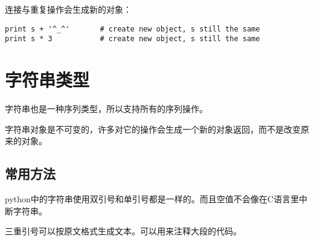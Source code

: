 连接与重复操作会生成新的对象：
\begin{lstlisting}
print s + '^_^'       # create new object, s still the same
print s * 3           # create new object, s still the same
\end{lstlisting}

\section{字符串类型}

字符串也是一种序列类型，所以支持所有的序列操作。

字符串对象是不可变的，许多对它的操作会生成一个新的对象返回，而不是改变原来的对象。

\subsection{常用方法}

python中的字符串使用双引号和单引号都是一样的。而且空值不会像在C语言里中断字符串。

三重引号可以按原文格式生成文本。可以用来注释大段的代码。

